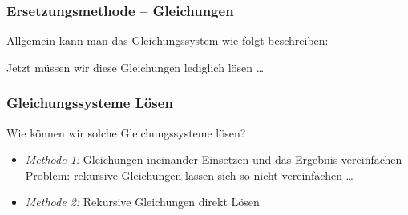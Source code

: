 \documentclass[aspectratio=1610,onlymath]{beamer}
\begin{document}
\begin{frame}\frametitle{Ersetzungsmethode -- Gleichungen}

Allgemein kann man das Gleichungssystem wie folgt beschreiben:\medskip


Jetzt müssen wir diese Gleichungen lediglich lösen \ldots

\end{frame}


\begin{frame}\frametitle{Gleichungssysteme Lösen}


Wie können wir solche Gleichungssysteme lösen?\pause
\begin{itemize}
\item \emph{Methode 1:} Gleichungen ineinander Einsetzen und das Ergebnis vereinfachen\\[1ex]

Problem: rekursive Gleichungen lassen sich so nicht vereinfachen \ldots\pause
\item \emph{Methode 2:} Rekursive Gleichungen direkt Lösen\\
\end{itemize}

\end{frame}
\end{document}
